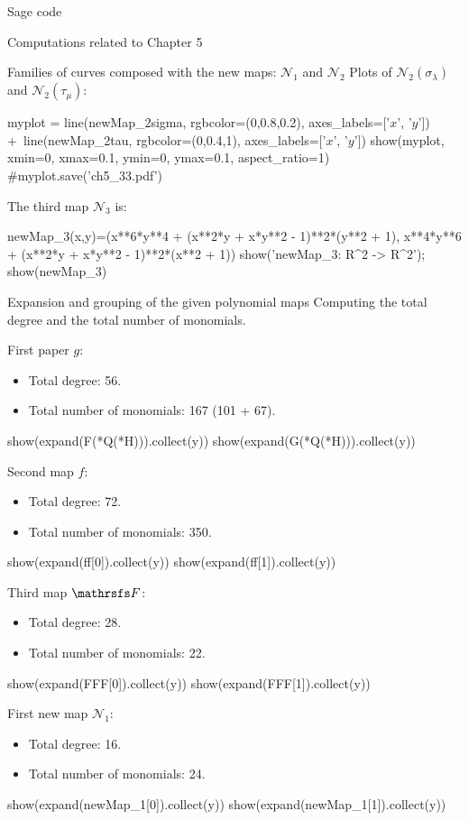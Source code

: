 \documentclass[11pt, a4paper, english, twoside, notitlepage, openright]{report}
\begin{document}
\begin{chapter}{Sage code}
\begin{section}{Computations related to Chapter 5}
\begin{subsection}{Families of curves composed with the new maps: $\mathcal{N}_1$ and $\mathcal{N}_2$}
Plots of $\mathcal{N}_2(\sigma_\lambda)$ and $\mathcal{N}_2(\tau_\mu)$:
\begin{sage}
myplot = line(newMap_2sigma, rgbcolor=(0,0.8,0.2), axes_labels=['$x$', '$y$']) +\
    line(newMap_2tau, rgbcolor=(0,0.4,1), axes_labels=['$x$', '$y$'])
show(myplot, xmin=0, xmax=0.1, ymin=0, ymax=0.1, aspect_ratio=1)
#myplot.save('ch5_33.pdf')
\end{sage}

The third map $\mathcal{N}_3$ is:
\begin{sage}
newMap_3(x,y)=(x**6*y**4 + (x**2*y + x*y**2 - 1)**2*(y**2 + 1), x**4*y**6 + (x**2*y + x*y**2 - 1)**2*(x**2 + 1))
show('newMap_3: R^2 -> R^2'); show(newMap_3)
\end{sage}
\end{subsection}

\begin{subsection}{Expansion and grouping of the given polynomial maps}
Computing the total degree and the total number of monomials.

First paper $g$:
\begin{itemize}
\item Total degree: 56.
\item Total number of monomials: 167 (101 + 67).
\end{itemize}
\begin{sage}
show(expand(F(*Q(*H))).collect(y))
show(expand(G(*Q(*H))).collect(y))
\end{sage}

Second map $f$:
\begin{itemize}
\item Total degree: 72.
\item Total number of monomials: 350.
\end{itemize}
\begin{sage}
show(expand(ff[0]).collect(y))
show(expand(ff[1]).collect(y))
\end{sage}

Third map $\FFF$:
\begin{itemize}
\item Total degree: 28.
\item Total number of monomials: 22. 
\end{itemize}
\begin{sage}
show(expand(FFF[0]).collect(y))
show(expand(FFF[1]).collect(y))
\end{sage}

First new map $\mathcal{N}_1$:
\begin{itemize}
\item Total degree: 16.
\item Total number of monomials: 24.
\end{itemize}
\begin{sage}
show(expand(newMap_1[0]).collect(y))
show(expand(newMap_1[1]).collect(y))
\end{sage}


\end{subsection}
\end{section}
\end{chapter}
\end{document}
